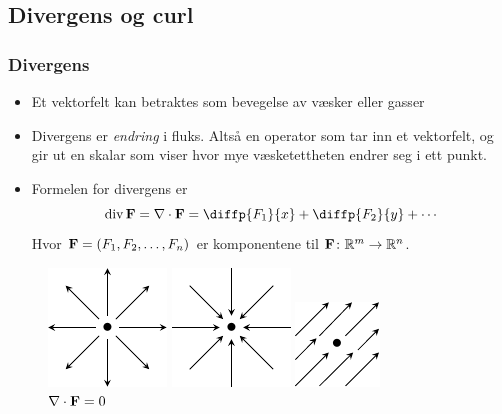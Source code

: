 \begin{frame}
  \section{Divergens og curl}
  \frametitle{Divergens}

\begin{itemize}
  \item Et vektorfelt kan betraktes som bevegelse av væsker eller gasser
  \item Divergens er \emph{endring} i fluks. Altså en operator som tar inn et vektorfelt, og gir ut en
    skalar som viser hvor mye væsketettheten endrer seg i ett punkt.
  \item Formelen for divergens er
    \begin{equation*}
      \div \F = \nabla \cdot \F
              = \diffp{{F_1}}{x} + 
              \diffp{{F_2}}{y} +
              \cdots 
    \end{equation*}
    Hvor $\mathbf{F} = (F_1, F_2, \ldots, F_n)$ er komponentene til $\mathbf{F} \colon \mathbb{R}^m \to \mathbb{R}^n$.
\end{itemize}

\begin{figure}
  \centering
  \begin{minipage}{.30\textwidth}
    \centering
  \includegraphics[scale=1.5]{../img/div-positive}
  \caption{$\nabla \cdot \F > 0 $}
\end{minipage}\hfill
\begin{minipage}{.30\textwidth}
    \centering
  \includegraphics[scale=1.5]{../img/div-negative}
  \caption{$\nabla \cdot \F <0 $}
\end{minipage}
\begin{minipage}{.30\textwidth}
    \centering
  \includegraphics[scale=1.5]{../img/div-null}
  \caption{$\nabla \cdot \mathbf{F} = 0$}
\end{minipage}
\end{figure}
\end{frame}

